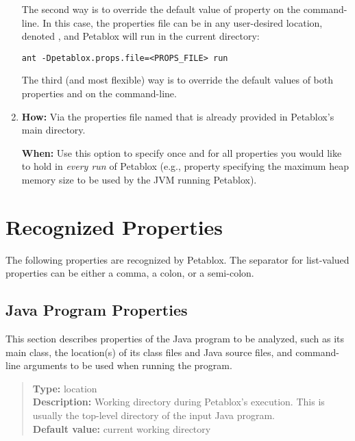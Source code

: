 \begin{enumerate}
The second way is to override the default value of property  on the command-line.
In this case, the properties file can be in any user-desired location, denoted , and Petablox
will run in the current directory:

\begin{framed}
\begin{verbatim}
ant -Dpetablox.props.file=<PROPS_FILE> run
\end{verbatim}
\end{framed}

The third (and most flexible) way is to override the default values of both properties 
and  on the command-line.


\item

{\bf How:} Via the properties file named  that is already provided in Petablox's main directory.

{\bf When:} Use this option to specify once and for all properties you would
like to hold in {\it every run} of Petablox (e.g., property 
specifying the maximum heap memory size to be used by the JVM running Petablox).
\end{enumerate}

\section{Recognized Properties}
\label{sec:properties-meaning}

The following properties are recognized by Petablox.
The separator for list-valued properties can be either a comma, a colon, or a semi-colon.

\subsection{Java Program Properties} 
\label{sec:program-props}

This section describes properties of the Java program to be analyzed, such as
its main class, the location(s) of its class files and Java source
files, and command-line arguments to be used when running the program.

\begin{quote}
{\bf Type:} location \\
{\bf Description:} Working directory during Petablox's execution.  This is
usually the top-level directory of the input Java program. \\
{\bf Default value:} current working directory
\end{quote}

